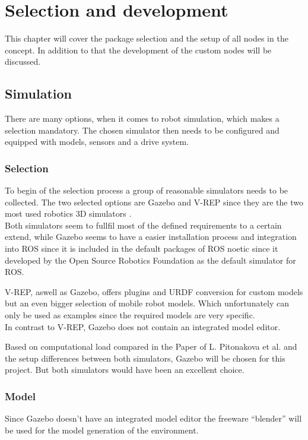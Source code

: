 \chapter{Selection and development}
\label{Selection}

This chapter will cover the package selection and the setup of all nodes in the concept. In addition to that the development of the custom nodes will be discussed.



\section{Simulation}
There are many options, when it comes to robot simulation, which makes a selection mandatory. The chosen simulator then needs to be configured and equipped with models, sensors and a drive system.

\subsection{Selection}
To begin of the selection process a group of reasonable simulators needs to be collected. The two selected options are Gazebo and V-REP since they are the two most used robotics 3D simulators \cite{SimComp}.\\

Both simulators seem to fullfil most of the defined requirements to a certain extend, while Gazebo seems to have a easier installation process and integration into ROS since it is included in the default packages of ROS noetic since it developed by the Open Source Robotics Foundation as the default simulator for ROS\cite{ROSPkg}.

V-REP, aswell as Gazebo, offers plugins and URDF conversion for custom models but an even bigger selection of mobile robot models. Which unfortunately can only be used as examples since the required models are very specific.\\
In contrast to V-REP, Gazebo does not contain an integrated model editor.

Based on computational load compared in the Paper of L. Pitonakova et al. and the setup differences between both simulators, Gazebo will be chosen for this project. But both simulators would have been an excellent choice\cite{Pitonakova}.

\subsection{Model}
Since Gazebo doesn't have an integrated model editor the freeware ``blender'' will be used for the model generation of the environment.

